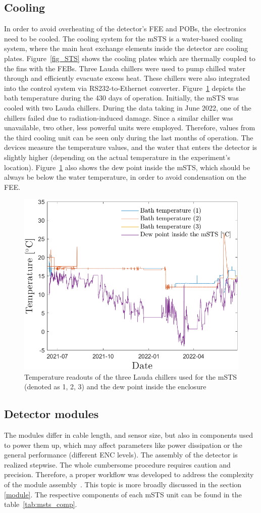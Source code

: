 \subsection{Cooling}
\label{msts_cooling}
In order to avoid overheating of the detector's \gls{FEE} and \glspl{POB}, the electronics need to be cooled. The cooling system for the \gls{mSTS} is a water-based cooling system, where the main heat exchange elements inside the detector are cooling plates.  Figure~\ref{fig_STS} shows the cooling plates which are thermally coupled to the fins with the \glspl{FEB}. Three Lauda chillers were used to pump chilled water through and efficiently evacuate excess heat. These chillers were also integrated into the control system via RS232-to-Ethernet converter. Figure~\ref{fig_cooling} depicts the bath temperature during the 430 days of operation. Initially, the \gls{mSTS} was cooled with two Lauda chillers. During the data taking in June 2022, one of the chillers failed due to radiation-induced damage. Since a similar chiller was unavailable, two other, less powerful units were employed. Therefore, values from the third cooling unit can be seen only during the last months of operation. The devices measure the temperature values, and the water that enters the detector is slightly higher (depending on the actual temperature in the experiment's location). Figure~\ref{fig_cooling} also shows the dew point inside the \gls{mSTS}, which should be always be below the water temperature, in order to avoid condensation on the \gls{FEE}.

\begin{figure}[!h]
\centering
\includegraphics[width=0.6\columnwidth]{Chapter5/DCS/images/cooling.png}
\caption{Temperature readouts of the three Lauda chillers used for the \gls{mSTS} (denoted as 1, 2, 3) and the dew point inside the enclosure}
\label{fig_cooling}
\end{figure}
\newpage
\subsection{Detector modules}
 The modules differ in cable length, and sensor size, but also in components used to power them up, which may affect parameters like power dissipation or the general performance (different ENC levels).  The assembly of the detector is realized stepwise. The whole cumbersome procedure requires caution and precision. Therefore, a proper workflow was developed to address the complexity of the module assembly~\cite{carmen2}. This topic is more broadly discussed in the section \ref{module}. The respective components of each \gls{mSTS} unit can be found in the table~\ref{tab:msts_comp}. 

